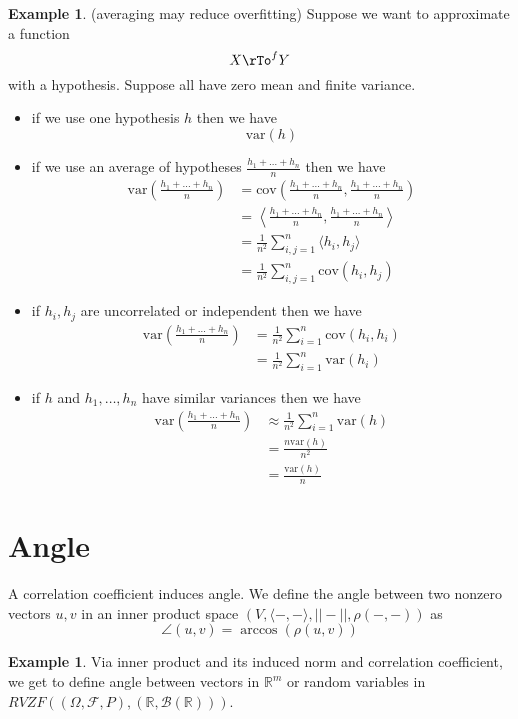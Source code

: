 \documentclass[12pt]{amsart}
\theoremstyle{definition}
\newtheorem{example}[theorem]{Example}
\begin{document}
\begin{example} (averaging may reduce overfitting) Suppose we want to approximate a function
$$X \rTo^f Y$$
with a hypothesis. Suppose all have zero mean and finite variance.
\begin{itemize}
\item if we use one hypothesis $h$ then we have
$$\text{var}(h)$$
\item if we use an average of hypotheses $\frac{h_1 + \dots + h_n}{n}$ then we have
\begin{align*}
\text{var} \left( \frac{h_1 + \dots + h_n}{n} \right) & = \text{cov} \left( \frac{h_1 + \dots + h_n}{n}, \frac{h_1 + \dots + h_n}{n} \right) \\
 & = \left\langle \frac{h_1 + \dots + h_n}{n}, \frac{h_1 + \dots + h_n}{n} \right\rangle \\
 & = \frac{1}{n^2} \sum\limits_{i, j = 1}^n \langle h_i, h_j \rangle \\
 & = \frac{1}{n^2} \sum\limits_{i, j = 1}^n \text{cov}(h_i, h_j)
\end{align*}
\item if $h_i, h_j$ are uncorrelated or independent then we have
\begin{align*}
\text{var} \left( \frac{h_1 + \dots + h_n}{n} \right) & = \frac{1}{n^2} \sum\limits_{i = 1}^n \text{cov}(h_i, h_i) \\
 & = \frac{1}{n^2} \sum\limits_{i = 1}^n \text{var}(h_i)
\end{align*}
\item if $h$ and $h_1, \dots , h_n$ have similar variances then we have
\begin{align*}
\text{var} \left( \frac{h_1 + \dots + h_n}{n} \right) & \approx \frac{1}{n^2} \sum\limits_{i = 1}^n \text{var}(h) \\
 & = \frac{n \text{var}(h)}{n^2} \\
 & = \frac{\text{var}(h)}{n}
\end{align*}
\end{itemize}
\end{example}
\vfill
\pagebreak

\section{Angle} A correlation coefficient induces angle.
\dfn We define the angle between two nonzero vectors $u, v$ in an inner product space $(V, \langle -,- \rangle, ||-||, \rho(-,-))$ as
$$\angle(u, v) = \arccos (\rho(u, v))$$
\vfill
\pagebreak

\begin{example} Via inner product and its induced norm and correlation coefficient, we get to define angle between vectors in $\mathbb{R}^m$ or random variables in $RVZF((\Omega, \mathcal{F},P), (\mathbb{R},\mathcal{B}(\mathbb{R})))$.
\end{example}
\end{document}
